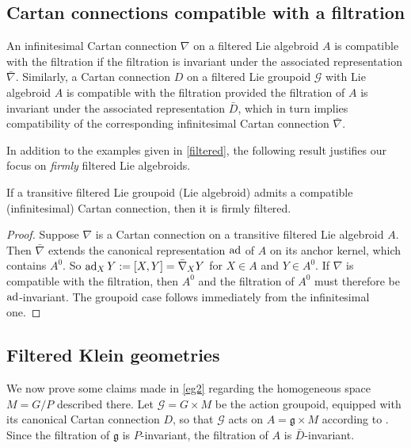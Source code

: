 \documentclass[leqno,12pt]{amsart} %
\begin{document}
\subsection{Cartan connections compatible with a filtration}\label{compat}
An infinitesimal Cartan connection $\nabla$ on a filtered Lie algebroid $A$ is {\df
  compatible} with the filtration if the filtration is invariant under the associated
representation $\bar\nabla $. Similarly, a Cartan connection $D$ on a filtered Lie
groupoid ${\mathcal G} $ with Lie algebroid $A$ is {\df compatible} with the filtration
provided the filtration of $A$ is invariant under the associated representation $\bar D$,
which in turn implies compatibility of the corresponding infinitesimal Cartan connection
$\bar\nabla$.

In addition to the examples given in \ref{filtered}, the following result justifies our
focus on {\em firmly} filtered Lie algebroids.
\begin{proposition}
  If a transitive filtered Lie groupoid (Lie algebroid) admits a compatible
  (infinitesimal) Cartan connection, then it is firmly filtered.
\end{proposition}
\begin{proof}
  Suppose $\nabla $ is a Cartan connection on a transitive filtered Lie algebroid
  $A$. Then $\bar\nabla $ extends the canonical representation $\operatorname{ad}$ of $A$ on its
  anchor kernel, which contains $A^0$. So $\operatorname{ad}_X Y := [X, Y] = \bar\nabla_XY$ for
  $X \in A$ and $Y \in A^0$. If $\nabla $ is compatible with the filtration, then $A^0$
  and the filtration of $A^0$ must therefore be $\operatorname{ad}$-invariant. The groupoid case
  follows immediately from the infinitesimal one.
\end{proof}

\subsection{Filtered Klein geometries}\label{homogeneous}
We now prove some claims made in \ref{eg2} regarding the homogeneous space $M=G/P$
described there. Let ${\mathcal G} = G \times M$ be the action groupoid, equipped with its
canonical Cartan connection $D$, so that ${\mathcal G}$ acts on
$A = {\mathfrak g} \times M$ according to . Since the filtration
of ${\mathfrak g} $ is $P$-invariant, the filtration of $A$ is $\bar D$-invariant.
\end{document}
